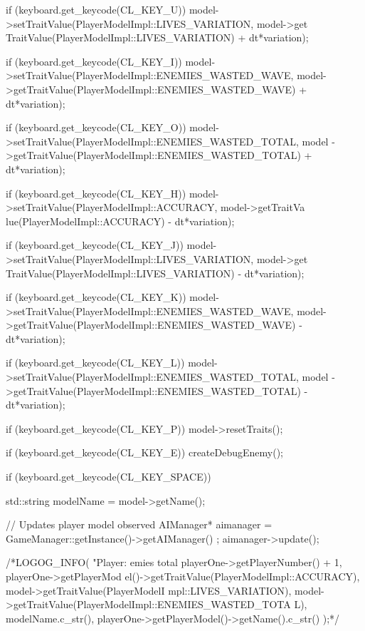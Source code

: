 \begin{DoxyCode}
{        if (keyboard.get_keycode(CL_KEY_U))
        {
                model->setTraitValue(PlayerModelImpl::LIVES_VARIATION, model->get
      TraitValue(PlayerModelImpl::LIVES_VARIATION) + dt*variation);
        }

        if (keyboard.get_keycode(CL_KEY_I))
        {
                model->setTraitValue(PlayerModelImpl::ENEMIES_WASTED_WAVE, model-
      >getTraitValue(PlayerModelImpl::ENEMIES_WASTED_WAVE) + dt*variation);
        }

        if (keyboard.get_keycode(CL_KEY_O))
        {
                model->setTraitValue(PlayerModelImpl::ENEMIES_WASTED_TOTAL, model
      ->getTraitValue(PlayerModelImpl::ENEMIES_WASTED_TOTAL) + dt*variation);
        }

        if (keyboard.get_keycode(CL_KEY_H))
        {
                model->setTraitValue(PlayerModelImpl::ACCURACY, model->getTraitVa
      lue(PlayerModelImpl::ACCURACY) - dt*variation);
        }

        if (keyboard.get_keycode(CL_KEY_J))
        {
                model->setTraitValue(PlayerModelImpl::LIVES_VARIATION, model->get
      TraitValue(PlayerModelImpl::LIVES_VARIATION) - dt*variation);
        }

        if (keyboard.get_keycode(CL_KEY_K))
        {
                model->setTraitValue(PlayerModelImpl::ENEMIES_WASTED_WAVE, model-
      >getTraitValue(PlayerModelImpl::ENEMIES_WASTED_WAVE) - dt*variation);
        }

        if (keyboard.get_keycode(CL_KEY_L))
        {
                model->setTraitValue(PlayerModelImpl::ENEMIES_WASTED_TOTAL, model
      ->getTraitValue(PlayerModelImpl::ENEMIES_WASTED_TOTAL) - dt*variation);
        }

        if (keyboard.get_keycode(CL_KEY_P))
        {
                model->resetTraits();
        }

        if (keyboard.get_keycode(CL_KEY_E))
        {
                createDebugEnemy();
        }

        if (keyboard.get_keycode(CL_KEY_SPACE))
        {
                std::string modelName = model->getName();

                // Updates player model observed
                AIManager* aimanager = GameManager::getInstance()->getAIManager()
      ;
                aimanager->update();
                
                /*LOGOG_INFO( "Player: %
      emies total %
                        playerOne->getPlayerNumber() + 1, playerOne->getPlayerMod
      el()->getTraitValue(PlayerModelImpl::ACCURACY), model->getTraitValue(PlayerModelI
      mpl::LIVES_VARIATION),
                        model->getTraitValue(PlayerModelImpl::ENEMIES_WASTED_TOTA
      L),     modelName.c_str(), playerOne->getPlayerModel()->getName().c_str() );*/
        }

}
\end{DoxyCode}
